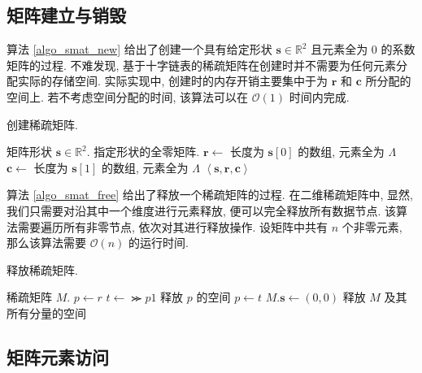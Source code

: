 \subsection{矩阵建立与销毁}

算法 \ref{algo_smat_new} 给出了创建一个具有给定形状 $\bm{s} \in \mathbb{R}^2$ 且元素全为 0 的系数矩阵的过程. 不难发现, 基于十字链表的稀疏矩阵在创建时并不需要为任何元素分配实际的存储空间. 实际实现中, 创建时的内存开销主要集中于为 $\bm{r}$ 和 $\bm{c}$ 所分配的空间上. 若不考虑空间分配的时间, 该算法可以在 $\mathcal{O}(1)$ 时间内完成.
\begin{breakablealgorithm}
\caption{创建稀疏矩阵.}
\label{algo_smat_new}
\begin{algorithmic}[1]
\Require 矩阵形状 $\bm{s} \in \mathbb{R}^2.$
\Ensure 指定形状的全零矩阵.
    \State $\bm{r} \gets$ 长度为 $\bm{s}[0]$ 的数组, 元素全为 $\Lambda$
    \State $\bm{c} \gets$ 长度为 $\bm{s}[1]$ 的数组, 元素全为 $\Lambda$
    \State \Return $\left\langle \bm{s}, \bm{r}, \bm{c} \right\rangle$
\EndFunction
\end{algorithmic}
\end{breakablealgorithm}

算法 \ref{algo_smat_free} 给出了释放一个稀疏矩阵的过程. 在二维稀疏矩阵中, 显然, 我们只需要对沿其中一个维度进行元素释放, 便可以完全释放所有数据节点. 该算法需要遍历所有非零节点, 依次对其进行释放操作. 设矩阵中共有 $n$ 个非零元素, 那么该算法需要 $\mathcal{O}(n)$ 的运行时间.
\begin{breakablealgorithm}
\caption{释放稀疏矩阵.}
\label{algo_smat_free}
\begin{algorithmic}[1]
\Require 稀疏矩阵 $M$.
        \State $p \gets r$
            \State $t \gets \Succ{p}{1}$
            \State 释放 $p$ 的空间
            \State $p \gets t$
        \EndWhile
    \EndFor
    \State $M.\bm{s} \gets (0, 0)$
    \State 释放 $M$ 及其所有分量的空间
\EndProcedure
\end{algorithmic}
\end{breakablealgorithm}

\subsection{矩阵元素访问}

